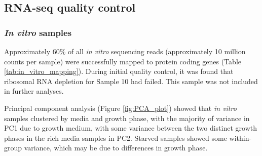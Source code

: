 \subsection{RNA-seq quality control}

\subsubsection{\textit{In vitro} samples}

Approximately 60\% of all \textit{in vitro} sequencing reads (approximately 10 million counts per sample) were successfully mapped to protein coding genes (Table \ref{tab:in_vitro_mapping}). During initial quality control, it was found that ribosomal RNA depletion for Sample 10 had failed. This sample was not included in further analyses.

Principal component analysis (Figure \ref{fig:PCA_plot}) showed that \textit{in vitro} samples clustered by media and growth phase, with the majority of variance in PC1 due to growth medium, with some variance between the two distinct growth phases in the rich media samples in PC2. Starved samples showed some within-group variance, which may be due to differences in growth phase.

